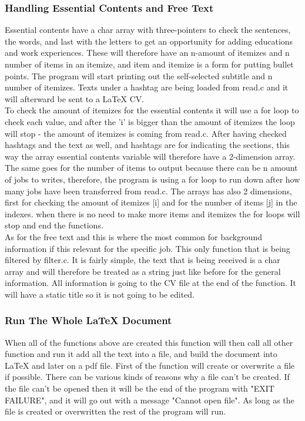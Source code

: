 \subsubsection{Handling Essential Contents and Free Text}
Essential contents have a char array with three-pointers to check the sentences,
the words, and last with the letters to get an opportunity for adding educations and work experiences.
These will therefore have an n-amount of itemizes and n number of items in an itemize, 
and item and itemize is a form for putting bullet points.
The program will start printing out the self-selected subtitle and n number of itemizes.
Texts under a hashtag are being loaded from read.c and it will afterward be sent to a LaTeX CV.\\
 
To check the amount of itemizes for the essential contents it will use a for loop to check each value,
and after the 'i' is bigger than the amount of itemizes the loop will stop - the amount of itemizes is coming from read.c.
After having checked hashtags and the text as well, and hashtags are for indicating the sections,
this way the array essential contents variable will therefore have a 2-dimension array.
The same goes for the number of items to output because there can be n amount of jobs to writes, 
therefore, the program is using a for loop to run down after how many jobs have been transferred from read.c.
The arrays has also 2 dimensions, first for checking the amount of itemizes [i] and for the number of items [j] in the indexes.
when there is no need to make more items and itemizes the for loops will stop and end the functions. \\

As for the free text and this is where the most common for background information if this relevant for the specific job.
This only function that is being filtered by filter.c. It is fairly simple, 
the text that is being received is a char array and will therefore be treated as a string 
just like before for the general information. All information is going to the CV file at the end of the function.
It will have a static title so it is not going to be edited.

\subsubsection{Run The Whole LaTeX Document}
When all of the functions above are created this function will then call all other function and run it add all the text into a file,
and build the document into LaTeX and later on a pdf file.
First of the function will create or overwrite a file if possible. There can be various kinds of reasons why a file can't be created.
If the file can't be opened then it will be the end of the program with "EXIT FAILURE", 
and it will go out with a message "Cannot open file".
As long as the file is created or overwritten the rest of the program will run.\\

